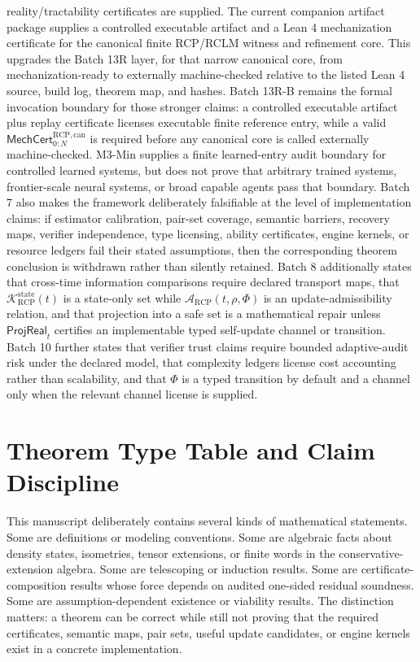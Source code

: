 \documentclass[11pt]{article}
\newcommand{\K}{\mathcal{K}}
\newcommand{\Acal}{\mathcal{A}}
\newcommand{\1}{\mathbf{1}}
\newcommand{\RCP}{\mathrm{RCP}}
\newcommand{\state}{\mathrm{state}}
\begin{document}
reality/tractability certificates are supplied. The current companion artifact package supplies a controlled executable artifact and a Lean 4 mechanization certificate for the canonical finite RCP/RCLM witness and refinement core.  This upgrades the Batch 13R layer, for that narrow canonical core, from mechanization-ready to externally machine-checked relative to the listed Lean 4 source, build log, theorem map, and hashes.  Batch 13R-B remains the formal invocation boundary for those stronger claims: a controlled executable artifact plus replay certificate licenses executable finite reference entry, while a valid \(\mathsf{MechCert}_{0:N}^{\RCP,\mathrm{can}}\) is required before any canonical core is called externally machine-checked. M3-Min supplies a finite learned-entry audit boundary for controlled learned systems, but does not prove that arbitrary trained systems, frontier-scale neural systems, or broad capable agents pass that boundary. Batch 7 also makes the framework deliberately falsifiable at the level of implementation claims: if estimator calibration, pair-set coverage, semantic barriers, recovery maps, verifier independence, type licensing, ability certificates, engine kernels, or resource ledgers fail their stated assumptions, then the corresponding theorem conclusion is withdrawn rather than silently retained. Batch 8 additionally states that cross-time information comparisons require declared transport maps, that \(\K_{\RCP}^{\state}(t)\) is a state-only set while \(\Acal_{\RCP}(t,\rho,\Phi)\) is an update-admissibility relation, and that projection into a safe set is a mathematical repair unless \(\mathsf{ProjReal}_t\) certifies an implementable typed self-update channel or transition. Batch 10 further states that verifier trust claims require bounded adaptive-audit risk under the declared model, that complexity ledgers license cost accounting rather than scalability, and that \(\Phi\) is a typed transition by default and a channel only when the relevant channel license is supplied.


\section{Theorem Type Table and Claim Discipline}
\label{sec:theorem_type_table}

This manuscript deliberately contains several kinds of mathematical statements. Some are definitions or modeling conventions. Some are algebraic facts about density states, isometries, tensor extensions, or finite words in the conservative-extension algebra. Some are telescoping or induction results. Some are certificate-composition results whose force depends on audited one-sided residual soundness. Some are assumption-dependent existence or viability results. The distinction matters: a theorem can be correct while still not proving that the required certificates, semantic maps, pair sets, useful update candidates, or engine kernels exist in a concrete implementation.
\end{document}
